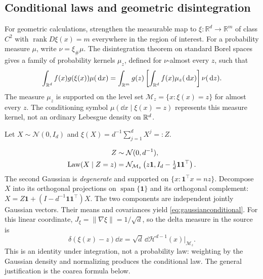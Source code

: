 \documentclass[12pt,a4paper,oneside]{book}
\begin{document}
\subsection{Conditional laws and geometric disintegration}
For geometric calculations, strengthen the measurable map to
$\xi:\mathbb R^d\to\mathbb R^m$ of class $C^2$ with
$\operatorname{rank}D\xi(x)=m$ everywhere in the region of interest.
For a probability measure $\mu$, write $\nu=\xi_\#\mu$. The disintegration theorem on
standard Borel spaces gives a family of probability kernels $\mu_z$,
defined for $\nu$-almost every $z$, such that
\begin{equation}
 \int_{\mathbb{R}^d}f(x)g(\xi(x))\mu(\,\mathrm{d} x)
 =\int_{\mathbb{R}^m}g(z)\left[\int_{\mathbb{R}^d}f(x)\mu_z(\,\mathrm{d} x)\right]\nu(\,\mathrm{d} z).
\label{eq:disintegration}
\end{equation}
The measure $\mu_z$ is supported on the level set
$\mathcal M_z=\{x:\xi(x)=z\}$ for almost every $z$. The conditioning symbol
$\mu(\dd x\mid\xi(x)=z)$ represents this measure kernel, not an ordinary
Lebesgue density on $\mathbb{R}^d$.

\begin{example}
\label{ex:gaussianconditional}
\label{src:p12q1}
\begin{Question}
Let $X\sim\mathcal N(0,I_d)$ and
$\xi(X)=d^{-1}\sum_{j=1}^dX^j=:Z$.
\end{Question}
\begin{solution}
\begin{equation}
\begin{aligned}
 Z&\sim\mathcal N(0,d^{-1}),\\
 \operatorname{Law}(X\mid Z=z)&=\mathcal N_{\mathcal M_z}
 \left(z\mathbf 1, I_d-\tfrac1d\mathbf 1\mathbf 1^\top\right).
\end{aligned}
\label{eq:gaussianconditional}
\end{equation}
The second Gaussian is \emph{degenerate} and supported on
$\{x:\mathbf 1^\top x=nz\}$.
Decompose $X$ into its orthogonal projections on
$\operatorname{span}\{\mathbf1\}$ and its orthogonal complement:
$X=Z\mathbf1+(I-d^{-1}\mathbf1\mathbf1^\top)X$. The two components are
independent jointly Gaussian vectors. Their means and covariances yield
\eqref{eq:gaussianconditional}. For this linear coordinate,
$J_\xi=\|\nabla\xi\|=1/\sqrt d$, so the delta measure in the source is
\begin{equation*}
\delta(\xi(x)-z)\dd x
 =\sqrt d\,\dd\mathcal H^{d-1}(x)\big|_{\mathcal M_z}.
\end{equation*}
This is an identity under integration, not a probability law: weighting
by the Gaussian density and normalizing produces the conditional law.
The general justification is the coarea formula below.
\end{solution}
\end{example}
\end{document}
